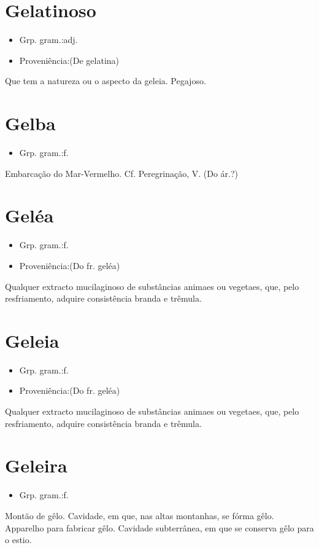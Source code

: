 \section{Gelatinoso}
\begin{itemize}
\item {Grp. gram.:adj.}
\end{itemize}
\begin{itemize}
\item {Proveniência:(De \textunderscore gelatina\textunderscore )}
\end{itemize}
Que tem a natureza ou o aspecto da geleia.
Pegajoso.
\section{Gelba}
\begin{itemize}
\item {Grp. gram.:f.}
\end{itemize}
Embarcação do Mar-Vermelho. Cf. \textunderscore Peregrinação\textunderscore , V.
(Do ár.?)
\section{Geléa}
\begin{itemize}
\item {Grp. gram.:f.}
\end{itemize}
\begin{itemize}
\item {Proveniência:(Do fr. \textunderscore geléa\textunderscore )}
\end{itemize}
Qualquer extracto mucilaginoso de substâncias animaes ou vegetaes, que, pelo resfriamento, adquire consistência branda e trêmula.
\section{Geleia}
\begin{itemize}
\item {Grp. gram.:f.}
\end{itemize}
\begin{itemize}
\item {Proveniência:(Do fr. \textunderscore geléa\textunderscore )}
\end{itemize}
Qualquer extracto mucilaginoso de substâncias animaes ou vegetaes, que, pelo resfriamento, adquire consistência branda e trêmula.
\section{Geleira}
\begin{itemize}
\item {Grp. gram.:f.}
\end{itemize}
Montão de gêlo.
Cavidade, em que, nas altas montanhas, se fórma gêlo.
Apparelho para fabricar gêlo.
Cavidade subterrânea, em que se conserva gêlo para o estio.
